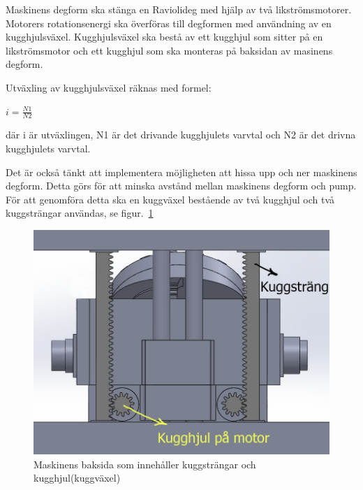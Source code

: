 Maskinens degform ska stänga en Raviolideg med hjälp av två likströmsmotorer. Motorers rotationsenergi ska överföras till degformen med användning av en kugghjulsväxel. Kugghjulsväxel ska bestå av ett kugghjul som sitter på en likströmsmotor och ett kugghjul som ska monteras på baksidan av masinens degform.

Utväxling av kugghjulsväxel räknas med formel:
\begin{center}
\LARGE \textbf{	$ i = \frac{N1}{N2}$}
\end{center}
där i är utväxlingen, N1 är det drivande kugghjulets varvtal och N2 är det drivna kugghjulets varvtal. 

Det är också tänkt att implementera möjligheten att hissa upp och ner maskinens degform. Detta görs för att minska avstånd mellan maskinens degform och pump. För att genomföra detta ska en kuggväxel bestående av två kugghjul och två kuggsträngar användas, se figur.~\ref{maskinens_baksida_metod}

\begin{figure}[ht]
	\begin{center}
		\includegraphics[scale=0.8]{images/maskinBaksida.jpg}
		\caption{Maskinens baksida som innehåller kuggsträngar och kugghjul(kuggväxel)}
		\label{maskinens_baksida_metod}	
	\end{center}
\end{figure}
